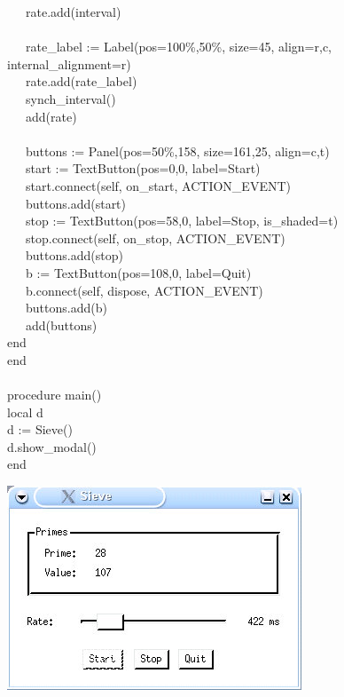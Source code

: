 {\>   \ \ \ rate.add(interval) \\
\ \\
\>   \ \ \ rate\_label :=
Label({\textquotedbl}pos=100\%,50\%{\textquotedbl},
{\textquotedbl}size=45{\textquotedbl},
{\textquotedbl}align=r,c{\textquotedbl},
{\textquotedbl}internal\_alignment=r{\textquotedbl}) \\
\>   \ \ \ rate.add(rate\_label) \\
\>   \ \ \ synch\_interval() \\
\>   \ \ \ add(rate) \\
\ \\
\>   \ \ \ buttons := Panel({\textquotedbl}pos=50\%,158{\textquotedbl},
{\textquotedbl}size=161,25{\textquotedbl},
{\textquotedbl}align=c,t{\textquotedbl}) \\
\>   \ \ \ start := TextButton({\textquotedbl}pos=0,0{\textquotedbl},
{\textquotedbl}label=Start{\textquotedbl}) \\
\>   \ \ \ start.connect(self, {\textquotedbl}on\_start{\textquotedbl},
ACTION\_EVENT) \\
\>   \ \ \ buttons.add(start) \\
\>   \ \ \ stop := TextButton({\textquotedbl}pos=58,0{\textquotedbl},
{\textquotedbl}label=Stop{\textquotedbl},
{\textquotedbl}is\_shaded=t{\textquotedbl}) \\
\>   \ \ \ stop.connect(self, {\textquotedbl}on\_stop{\textquotedbl},
ACTION\_EVENT) \\
\>   \ \ \ buttons.add(stop) \\
\>   \ \ \ b := TextButton({\textquotedbl}pos=108,0{\textquotedbl},
{\textquotedbl}label=Quit{\textquotedbl}) \\
\>   \ \ \ b.connect(self, {\textquotedbl}dispose{\textquotedbl},
ACTION\_EVENT) \\
\>   \ \ \ buttons.add(b) \\
\>   \ \ \ add(buttons) \\
\>   end \\
end \\
\ \\
procedure main() \\
\>   local d \\
\>   d := Sieve() \\
\>   d.show\_modal() \\
end
}

\bigskip

\begin{center}
\includegraphics[width=3.4575in,height=2.3953in]{ub-img/ub-img58.jpg}
\end{center}

